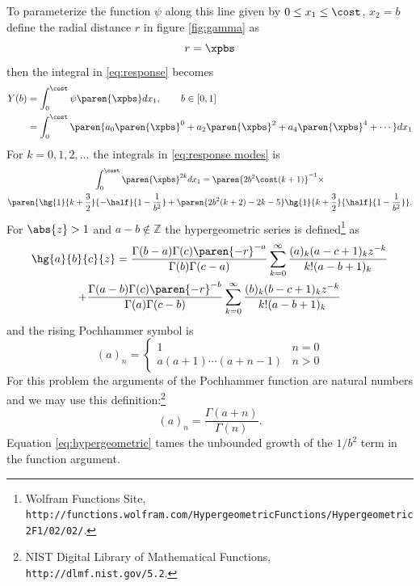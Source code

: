 \documentclass[final,leqno,onefignum,onetabnum]{siamltex1213}
\begin{document}
To parameterize the function $\psi$ along this line given by $0\le x_{1} \le \cost$, $x_{2} = b$ define the radial distance $r$ in figure \eqref{fig:gamma} as
  \begin{equation}
    r = \xpbs
  \end{equation}
then the integral in \eqref{eq:response} becomes
  \begin{equation}
    \begin{split}
      Y(b) &= \int_{0}^{\cost} \psi \paren{\xpbs} dx_{1}, \qquad b \in [0,1] \\
           &= \int_{0}^{\cost} \paren{ a_{0}\paren{\xpbs}^{0} + a_{2}\paren{\xpbs}^{2} + a_{4}\paren{\xpbs}^{4} + \cdots } dx_{1}
    \end{split}
    \label{eq:response modes}
  \end{equation}
For $k=0,1,2,\dots$ the integrals in \eqref{eq:response modes} is
  \begin{multline}
    \int_{0}^{\cost} \paren{\xpbs}^{2k} dx_{1} = \paren{2b^{2} \cost (k+1)}^{-1} \times\\
    \paren{\hg{1}{k+\frac{3}{2}}{-\half}{1-\frac{1}{b^{2}}} + \paren{2b^{2}(k+2)-2k-5}\hg{1}{k+\frac{3}{2}}{\half}{1-\frac{1}{b^{2}}}} .
  \label{eq:hg 1}
  \end{multline}
%
For $\abs{z}>1$ and $a-b\notin\mathbb{Z}$ the hypergeometric series is defined\footnote{Wolfram Functions Site,\\ \texttt{http://functions.wolfram.com/HypergeometricFunctions/Hypergeometric2F1/02/02/}.} as
%
\begin{multline}
  \hg{a}{b}{c}{z} = 
    \frac{\Gamma(b-a)\Gamma(c)\paren{-r}^{-a}} {\Gamma(b)\Gamma(c-a)}
      \sum_{k=0}^{\infty} \frac{(a)_{k}(a-c+1)_{k}z^{-k}} {k!(a-b+1)_{k}} \\ +
    \frac{\Gamma(a-b)\Gamma(c)\paren{-r}^{-b}} {\Gamma(a)\Gamma(c-b)}
      \sum_{k=0}^{\infty} \frac{(b)_{k}(b-c+1)_{k}z^{-k}} {k!(a-b+1)_{k}}
  \label{eq:hypergeometric}
\end{multline}
%
and the rising Pochhammer symbol is 
%
\begin{equation}
  (a)_{n} = 
  \begin{cases}
    1 & n=0 \\
    a(a+1)\cdots(a+n-1) & n > 0
  \end{cases}
\end{equation}
%
For this problem the arguments of the Pochhammer function are natural numbers and we may use this definition:\footnote{NIST Digital Library of Mathematical Functions, \texttt{http://dlmf.nist.gov/5.2}.}
  \begin{equation}
     (a)_{n} = \frac{\Gamma(a+n)} {\Gamma(n)}.
  \end{equation}
Equation \eqref{eq:hypergeometric} tames the unbounded growth of the $1/b^{2}$ term in the function argument. 
\end{document}
